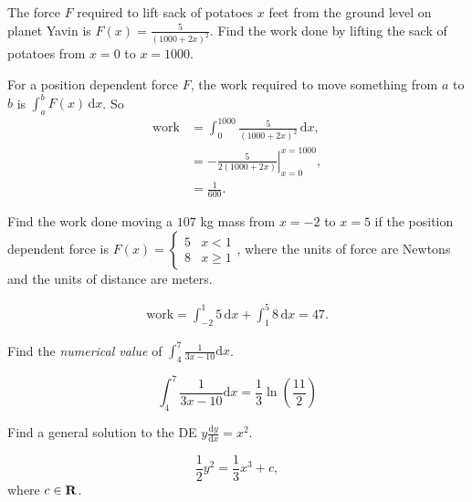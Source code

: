 \documentclass[12pt,fleqn,answers]{exam}
\begin{document}
\begin{questions}

\question The force $F$ required to lift sack of potatoes $x$ feet from the ground level on planet Yavin is
$F(x) = \frac{5}{(1000 + 2 x)^2}$. Find the work done by lifting the sack of potatoes from $x=0$ to $x=1000$.
\begin{solution}[3.0in] 
  For a position dependent force $F$, the work required to move something from
  $a$ to $b$ is $\int_a^b F(x) \,\mathrm{d} x$. So
  \begin{align*}
  \mbox{work} &= \int_0^{1000} \frac{5}{(1000 + 2 x)^2} \, \mathrm{d} x, \\
              &= - \left. \frac{5}{2 (1000 + 2 x)} \right|_{x=0}^{x=1000}, \\
              &= \frac{1}{600}.
  \end{align*}
 
\end{solution}

\question [5] Find the work done moving a $107$ kg mass from $x= -2 $ to $x =5$ if 
the position dependent force is $F(x)= \begin{cases} 5 & x < 1 \\ 8 & x \geq 1 
\end{cases}$, where
the units of force are Newtons and the units of distance are meters.
\begin{solution}[3.0in] 
\begin{align*}
\mbox{work} = \int_{-2}^1 5 \, \mathrm{d}x + \int_{1}^5 8 \, \mathrm{d}x
   = 47.
\end{align*}
\end{solution}

\question[5]  Find the \emph{numerical   value} of  \(\displaystyle  \int_4^7 \frac{1}{3 x - 10} \mathrm{d} x \).   
\begin{solution}%
\[
    \int_4^7 \frac{1}{3 x - 10} \mathrm{d} x = \frac{1}{3}
     \ln\left(\frac{11}{2}\right)
\]
\end{solution}


\question[5] Find a general solution to the DE \(\displaystyle y \frac{\mathrm{d} y}{\mathrm{d} x} = x^2  \).

\begin{solution}[2.5in]
 \[ \frac{1}{2} y^2 =  \frac{1}{3} x^3  + c,\]
 where $c \in \mathbf{R}$.
\end{solution}




\end{questions}
\end{document}
